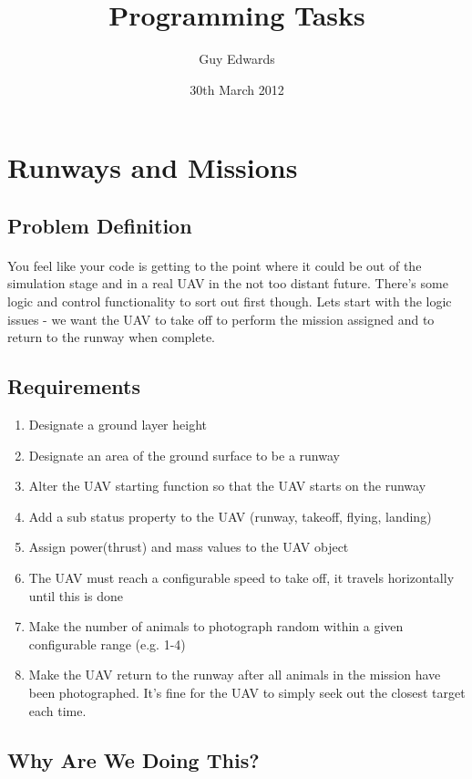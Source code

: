 \documentclass[11pt]{book}
\title{\textbf{Programming Tasks}}
\author{Guy Edwards}
\date{30th March 2012}
\begin{document}
\section{Runways and Missions}

\subsection{Problem Definition}

\paragraph{} You feel like your code is getting to the point where it could be out of the simulation stage and in a real UAV in the not too distant future. There's some logic and control functionality to sort out first though. Lets start with the logic issues - we want the UAV to take off to perform the mission assigned and to return to the runway when complete.

\subsection{Requirements}

\begin{enumerate}
\item Designate a ground layer height
\item Designate an area of the ground surface to be a runway
\item Alter the UAV starting function so that the UAV starts on the runway
\item Add a sub status property to the UAV (runway, takeoff, flying, landing)
\item Assign power(thrust) and mass values to the UAV object
\item The UAV must reach a configurable speed to take off, it travels horizontally until this is done
\item Make the number of animals to photograph random within a given configurable range (e.g. 1-4)
\item Make the UAV return to the runway after all animals in the mission have been photographed. It's fine for the UAV to simply seek out the closest target each time.
\end{enumerate}

\subsection{Why Are We Doing This?}
\end{document}

